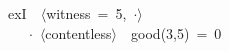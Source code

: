 exI~~$\langle$witness~=~5,~$\cdot$$\rangle$ \\
~~~$\cdot$~$\langle$contentless$\rangle$~~good(3,5)~=~0
